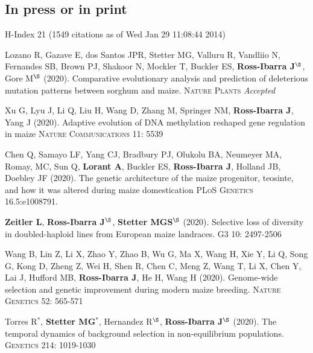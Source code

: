 \documentclass[letterpaper,10pt]{article}
\begin{document}
\subsection*{In press or in print} %
H-Index 21 {\small(1549 citations as of Wed Jan 29 11:08:44 2014)}
\begin{etaremune}
\setlength\itemsep{0ex}

\item Lozano R, Gazave E, dos Santos JPR, Stetter MG, Valluru R, Vandliio N, Fernandes SB, Brown PJ, Shakoor N, Mockler T, Buckler ES, \textbf{Ross-Ibarra J}$^\S$, Gore M$^\S$ (2020). Comparative evolutionary analysis and prediction of deleterious mutation patterns between sorghum and maize. \textsc{Nature Plants} \textit{Accepted} %

\item Xu G, Lyu J, Li Q, Liu H, Wang D, Zhang M, Springer NM, \textbf{Ross-Ibarra J}, Yang J (2020). Adaptive evolution of DNA methylation reshaped gene regulation in maize \textsc{Nature Communications} 11: 5539

\item Chen Q, Samayo LF, Yang CJ, Bradbury PJ, Olukolu BA, Neumeyer MA, Romay, MC, Sun Q, \textbf{Lorant A}, Buckler ES, \textbf{Ross-Ibarra J}, Holland JB, Doebley JF (2020).
The genetic architecture of the maize progenitor, teosinte, and how it was altered during maize domestication \textsc{PLoS Genetics} 16.5:e1008791.

\item \textbf{Zeitler L}, \textbf{Ross-Ibarra J}$^\S$, \textbf{Stetter MGS}$^\S$ (2020). Selective loss of diversity in doubled-haploid lines from European maize landraces. \textsc{G3} 10: 2497-2506

\item Wang B, Lin Z, Li X, Zhao Y, Zhao B, Wu G, Ma X, Wang H, Xie Y, Li Q, Song G, Kong D, Zheng Z, Wei H, Shen R, Chen C, Meng Z, Wang T, Li X, Chen Y, Lai J, Hufford MB, \textbf{Ross-Ibarra J}, He H, Wang H (2020). Genome-wide selection and genetic improvement during modern maize breeding. \textsc{Nature  Genetics} 52: 565-571

\item Torres R$^*$, \textbf{Stetter MG}$^*$, Hernandez R$^\S$, \textbf{Ross-Ibarra J}$^\S$ (2020). The temporal dynamics of background selection in non-equilibrium populations. \textsc{Genetics} 214: 1019-1030


\end{etaremune}
\end{document}

